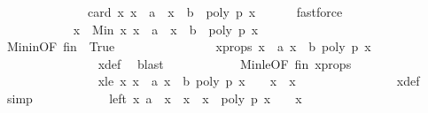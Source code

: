 \begin{isabellebody}
\ \ \ \ \ \ \ \ \ \ \ \ \ \ {\isachardoublequoteopen}card\ {\isacharbraceleft}x{\isachardot}\ x\ {\isachargreater}\ a\ {\isasymand}\ x\ {\isasymle}\ b\ {\isasymand}\ poly\ p\ x\ {\isacharequal}\ {}{\isacharbraceright}\ {\isachargreater}\ {}{\isachardoublequoteclose}\ \isamarkupfalse%
\ fastforce\isanewline
\ \ \ \ \ \ \ \ \ \ \ \ \ \ \isanewline
\ \ \ \ \ \ \ \ \ \ \isamarkupfalse%
\ x\ {\isasymequiv}\ {\isachardoublequoteopen}Min\ {\isacharbraceleft}x{\isachardot}\ x\ {\isachargreater}\ a\ {\isasymand}\ x\ {\isasymle}\ b\ {\isasymand}\ poly\ p\ x\ {\isacharequal}\ {}{\isacharbraceright}{\isachardoublequoteclose}\isanewline
\ \ \ \ \ \ \ \ \ \ \isamarkupfalse%
\ Min{\isacharunderscore}in{\isacharbrackleft}OF\ fin{\isacharbrackright}\ \ True\isanewline
\ \ \ \ \ \ \ \ \ \ \ \ \ \ \isamarkupfalse%
\ x{\isacharunderscore}props{\isacharcolon}\ {\isachardoublequoteopen}x\ {\isachargreater}\ a{\isachardoublequoteclose}\ {\isachardoublequoteopen}x\ {\isasymle}\ b{\isachardoublequoteclose}\ {\isachardoublequoteopen}poly\ p\ x\ {\isacharequal}\ {}{\isachardoublequoteclose}\ \isanewline
\ \ \ \ \ \ \ \ \ \ \ \ \ \ \isamarkupfalse%
\ x{\isacharunderscore}def\ \isamarkupfalse%
\ blast{\isacharplus}\isanewline
\ \ \ \ \ \ \ \ \ \ \isamarkupfalse%
\ Min{\isacharunderscore}le{\isacharbrackleft}OF\ fin{\isacharbrackright}\ x{\isacharunderscore}props\ \isanewline
\ \ \ \ \ \ \ \ \ \ \ \ \ \ \isamarkupfalse%
\ x{\isacharunderscore}le{\isacharcolon}\ {\isachardoublequoteopen}{\isasymAnd}x{\isacharprime}{\isachardot}\ {\isasymlbrakk}x{\isacharprime}\ {\isachargreater}\ a{\isacharsemicolon}\ x{\isacharprime}\ {\isasymle}\ b{\isacharsemicolon}\ poly\ p\ x{\isacharprime}\ {\isacharequal}\ {}{\isasymrbrakk}\ {\isasymLongrightarrow}\ x\ {\isasymle}\ x{\isacharprime}{\isachardoublequoteclose}\isanewline
\ \ \ \ \ \ \ \ \ \ \ \ \ \ \isamarkupfalse%
\ x{\isacharunderscore}def\ \isamarkupfalse%
\ simp\isanewline
\isanewline
\ \ \ \ \ \ \ \ \ \ \isamarkupfalse%
\ left{\isacharcolon}\ {\isachardoublequoteopen}{\isacharbraceleft}x{\isacharprime}{\isachardot}\ a\ {\isacharless}\ x{\isacharprime}\ {\isasymand}\ x{\isacharprime}\ {\isasymle}\ x\ {\isasymand}\ poly\ p\ x{\isacharprime}\ {\isacharequal}\ {}{\isacharbraceright}\ {\isacharequal}\ {\isacharbraceleft}x{\isacharbraceright}{\isachardoublequoteclose}\isanewline

\end{isabellebody}
